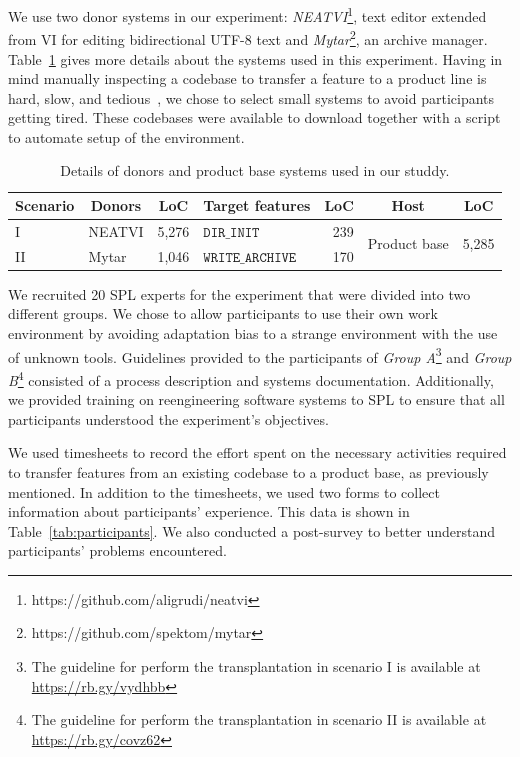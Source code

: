 We use two donor systems in our experiment:
\emph{NEATVI}\footnote{https://github.com/aligrudi/neatvi}, text editor extended from VI for editing bidirectional UTF-8 text and \emph{Mytar}\footnote{https://github.com/spektom/mytar}, an archive manager.  
Table~\ref{tab:instrumentation} gives more details about the systems used in this experiment. Having in mind manually inspecting a codebase to transfer a feature to a product line is hard, slow, and tedious~\cite{Mahmood2021}, we chose to select small systems to avoid participants getting tired. These codebases were available to download together with a script to automate setup of the environment.

\begin{table}[ht]
	\caption{Details of donors and product base systems used in our studdy.}
	\label{tab:instrumentation}
    \begin{center}
    	\begin{tabular}{l|lr|lr|lr} \hline
    		\multicolumn{1}{c}{Scenario} & \multicolumn{1}{|c}{Donors} & \multicolumn{1}{c|}{LoC}   & \multicolumn{1}{c}{Target features}       & \multicolumn{1}{c|}{LoC}  & \multicolumn{1}{c}{Host}& \multicolumn{1}{c}{LoC} \\\hline
    		I       & NEATVI & 5,276 & $\texttt{DIR\_INIT}$  & 239&\multirow{2}{*}{Product base}&\multirow{2}{*}{5,285} \\
    		II      & Mytar  & 1,046 & $\texttt{WRITE\_ARCHIVE}$ & 170&& \\\hline
    	\end{tabular}
    \end{center}
\end{table}

We recruited 20 SPL experts for the experiment that were divided into two different groups.  We chose to allow participants to use their own work environment by avoiding adaptation bias to a strange environment with the use of unknown tools.
Guidelines provided to the participants of \emph{Group A}\footnote{The guideline for perform the transplantation in  scenario I is available at \url{https://rb.gy/vydhbb}} and \emph{Group B}\footnote{The guideline for perform the transplantation in scenario II is available at \url{https://rb.gy/covz62}} consisted of a process description and systems documentation. Additionally, we provided training on reengineering software systems to SPL to ensure that all participants understood the experiment's objectives.

We used timesheets to record the effort spent on the necessary activities required to transfer features from an existing codebase to a product base, as previously mentioned. In addition to the timesheets, we used two forms to collect information about participants' experience. This data is shown in Table~\ref{tab:participants}. 
We also conducted a post-survey to better understand participants' problems encountered.  

